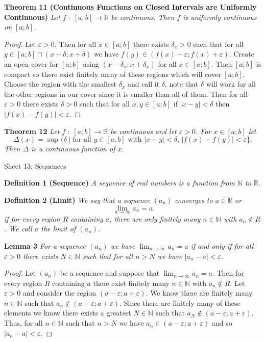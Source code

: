 \documentclass{article}
\begin{document}
\begin{flushleft}
\textbf{Theorem 11 (Continuous Functions on Closed Intervals are Uniformly Continuous)}
\textsl{Let $f \; : \; [a;b] \rightarrow \mathbb{R}$ be continuous. Then $f$ is uniformly continuous on $[a;b]$.}
\begin{proof}
Let $\varepsilon > 0$. Then for all $x \in [a;b]$ there exists $\delta_x > 0$ such that for all $y \in [a;b] \cap (x - \delta ; x + \delta)$ we have $f(y) \in (f(x) - \varepsilon ; f(x) + \varepsilon)$. Create an open cover for $[a;b]$ using $(x - \delta_x ; x + \delta_x)$ for all $x \in [a;b]$. Then $[a;b]$ is compact so there exist finitely many of these regions which will cover $[a;b]$. Choose the region with the smallest $\delta_x$ and call it $\delta$, note that $\delta$ will work for all the other regions in our cover since it is smaller than all of them. Then for all $\varepsilon > 0$ there exists $\delta > 0$ such that for all $x,y \in [a;b]$ if $|x-y| < \delta$ then $|f(x)-f(y)| < \varepsilon$.
\end{proof}

\textbf{Theorem 12}
\textsl{Let $f \; : \; [a;b] \rightarrow \mathbb{R}$ be continuous and let $\varepsilon > 0$. For $x \in [a;b]$ let
\[
\Delta(x) = \sup \{\delta \mid \text{for all $y \in [a;b]$ with $|x-y| < \delta$, $|f(x)-f(y)| < \varepsilon$}\}.
\]
Then $\Delta$ is a continuous function of $x$.}

\newpage

\Large

Sheet 13: Sequences\newline

\normalsize

\textbf{Definition 1 (Sequence)}
\textsl{A sequence of real numbers is a function from $\mathbb{N}$ to $\mathbb{R}$.}\newline

\textbf{Definition 2 (Limit)}
\textsl{We say that a sequence $(a_n)$ converges to $a \in \mathbb{R}$ or
\[
\lim_{n \rightarrow \infty} a_n = a
\]
if for every region $R$ containing $a$, there are only finitely many $n \in \mathbb{N}$ with $a_n \notin R$. We call $a$ the limit of $(a_n)$.}\newline

\textbf{Lemma 3}
\textsl{For a sequence $(a_n)$ we have $\lim_{n \rightarrow \infty} a_n = a$ if and only if for all $\varepsilon > 0$ there exists $N \in \mathbb{N}$ such that for all $n > N$ we have $|a_n - a| < \varepsilon$.}
\begin{proof}
Let $(a_n)$ be a sequence and suppose that $\lim _{n \rightarrow \infty} a_n = a$. Then for every region $R$ containing $a$ there exist finitely many $n \in \mathbb{N}$ with $a_n \notin R$. Let $\varepsilon > 0$ and consider the region $(a - \varepsilon ; a + \varepsilon)$. We know there are finitely many $n \in \mathbb{N}$ such that $a_n \notin (a - \varepsilon ; a + \varepsilon)$. Since there are finitely many of these elements we know there exists a greatest $N \in \mathbb{N}$ such that $a_N \notin (a - \varepsilon ; a + \varepsilon)$. Thus, for all $n \in \mathbb{N}$ such that $n > N$ we have $a_n \in (a - \varepsilon ; a + \varepsilon)$ and so $|a_n - a| < \varepsilon$.\newline


\end{proof}
\end{flushleft}
\end{document}
